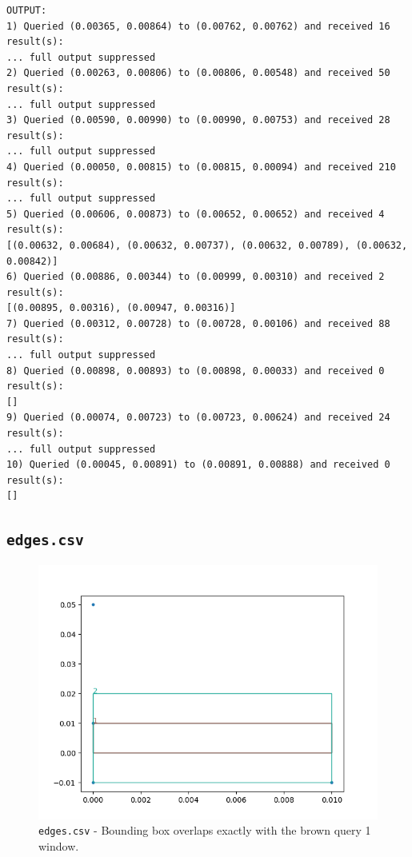 \documentclass[12pt]{article}
\begin{document}
{\begin{verbatim}
OUTPUT:
1) Queried (0.00365, 0.00864) to (0.00762, 0.00762) and received 16 result(s):
... full output suppressed
2) Queried (0.00263, 0.00806) to (0.00806, 0.00548) and received 50 result(s):
... full output suppressed
3) Queried (0.00590, 0.00990) to (0.00990, 0.00753) and received 28 result(s):
... full output suppressed
4) Queried (0.00050, 0.00815) to (0.00815, 0.00094) and received 210 result(s):
... full output suppressed
5) Queried (0.00606, 0.00873) to (0.00652, 0.00652) and received 4 result(s):
[(0.00632, 0.00684), (0.00632, 0.00737), (0.00632, 0.00789), (0.00632, 0.00842)]
6) Queried (0.00886, 0.00344) to (0.00999, 0.00310) and received 2 result(s):
[(0.00895, 0.00316), (0.00947, 0.00316)]
7) Queried (0.00312, 0.00728) to (0.00728, 0.00106) and received 88 result(s):
... full output suppressed
8) Queried (0.00898, 0.00893) to (0.00898, 0.00033) and received 0 result(s):
[]
9) Queried (0.00074, 0.00723) to (0.00723, 0.00624) and received 24 result(s):
... full output suppressed
10) Queried (0.00045, 0.00891) to (0.00891, 0.00888) and received 0 result(s):
[]
\end{verbatim}

\subsection{\texttt{edges.csv}}

\begin{figure}
    \centering
    \includegraphics[scale=0.8]{../img/edges.png}
    \caption{\texttt{edges.csv} - Bounding box overlaps exactly with the brown query 1 window.}
    \label{fig:my_label}
\end{figure}

}
\end{document}
